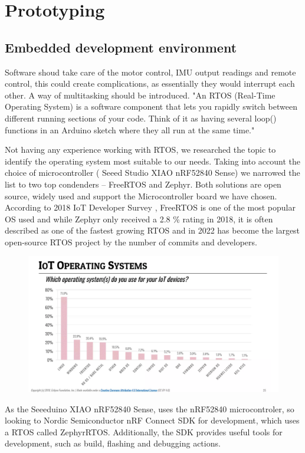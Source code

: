 \documentclass[a4paper,11pt]{article}
\begin{document}
\section{Prototyping}
\subsection{Embedded development environment}

Software shoud take care of the motor control, IMU output readings and remote control, this could create complications, as essentially they would interrupt each other. A way of multitasking should be introduced.
"An RTOS (Real-Time Operating System) is a software component that lets you rapidly switch between different running sections of your code. Think of it as having several loop() functions in an Arduino sketch where they all run at the same time." \cite{Joe2019}

Not having any experience working with RTOS, we researched the topic to identify the operating system most suitable to our needs. Taking into account the choice of microcontroller ( Seeed Studio XIAO nRF52840 Sense) we narrowed the list to two top condenders – FreeRTOS and Zephyr. Both solutions are open source, widely used and support the Microcontroller board we have chosen. \cite{Lemberg}
According to 2018 IoT Developer Survey \cite{IOT}, FreeRTOS is one of the most popular OS used and while Zephyr only received a 2.8 \% rating in 2018, it is often described as one of the fastest growing RTOS and in 2022 has become the largest open-source RTOS project by the number of commits and developers.
\begin{figure}
    \centering
    \includegraphics[scale = 0.5]{iot_os.PNG}
\end{figure}
As the Seeeduino XIAO nRF52840 Sense, uses the nRF52840 microcontroler, so looking to Nordic Semiconductor nRF Connect SDK for development, which uses a RTOS called ZephyrRTOS.
Additionally, the SDK provides useful tools for development, such as build, flashing and debugging actions. \cite{nRF}
\end{document}
